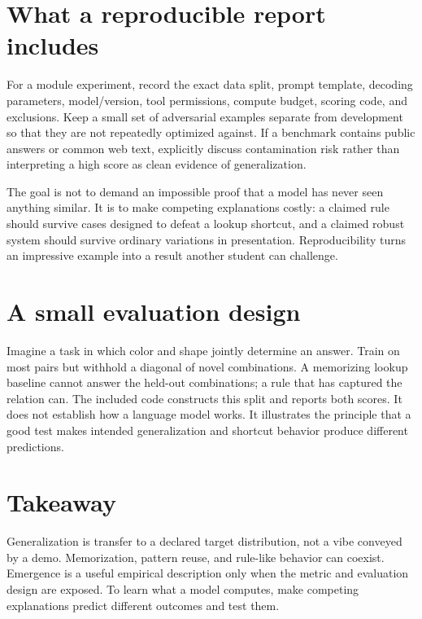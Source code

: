 \documentclass[11pt]{article}
\begin{document}
\section{What a reproducible report includes}
For a module experiment, record the exact data split, prompt template, decoding parameters, model/version, tool permissions, compute budget, scoring code, and exclusions. Keep a small set of adversarial examples separate from development so that they are not repeatedly optimized against. If a benchmark contains public answers or common web text, explicitly discuss contamination risk rather than interpreting a high score as clean evidence of generalization.

The goal is not to demand an impossible proof that a model has never seen anything similar. It is to make competing explanations costly: a claimed rule should survive cases designed to defeat a lookup shortcut, and a claimed robust system should survive ordinary variations in presentation. Reproducibility turns an impressive example into a result another student can challenge.

\section{A small evaluation design}
Imagine a task in which color and shape jointly determine an answer. Train on most pairs but withhold a diagonal of novel combinations. A memorizing lookup baseline cannot answer the held-out combinations; a rule that has captured the relation can. The included code constructs this split and reports both scores. It does not establish how a language model works. It illustrates the principle that a good test makes intended generalization and shortcut behavior produce different predictions.

\section{Takeaway}
Generalization is transfer to a declared target distribution, not a vibe conveyed by a demo. Memorization, pattern reuse, and rule-like behavior can coexist. Emergence is a useful empirical description only when the metric and evaluation design are exposed. To learn what a model computes, make competing explanations predict different outcomes and test them.

\end{document}
